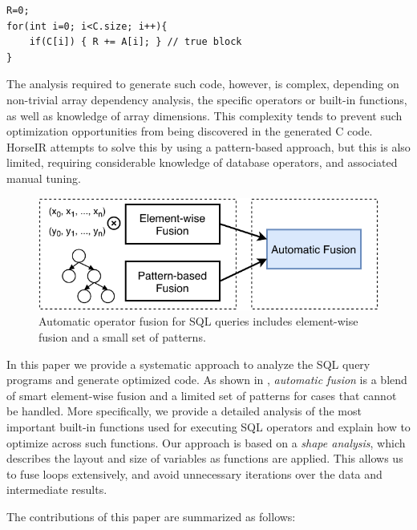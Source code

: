 \begin{small}
\begin{Verbatim}[xleftmargin=.15\columnwidth]
R=0;
for(int i=0; i<C.size; i++){
    if(C[i]) { R += A[i]; } // true block
}
\end{Verbatim}
\end{small}

\noindent{}The analysis required to generate such code, however, is complex,
depending on non-trivial array dependency analysis, the specific operators or built-in functions, as well as knowledge of array dimensions.
This complexity tends to prevent such optimization opportunities from being discovered in the generated C code.
HorseIR attempts to solve this by using a pattern-based approach, but this is also limited, requiring
considerable knowledge of database operators, and associated manual tuning.

\begin{figure}[htbp]
\centering
\includegraphics[width=.9\columnwidth]{./src/figure/basic-idea.pdf}
\caption{Automatic operator fusion for SQL queries includes element-wise fusion and a small set of patterns.}
\label{fig:fusion_idea}
\end{figure}

In this paper we provide a systematic approach to analyze the SQL query programs
and generate optimized code. As shown in ,
\textit{automatic fusion} is a blend of smart element-wise fusion and a limited set of
patterns for cases that cannot be handled. More specifically, we provide a detailed
analysis of the most important built-in functions used for executing SQL operators
and explain how to optimize across such functions. Our approach is based on a
\textit{shape analysis}, which describes the layout and size of variables as
functions are applied. This allows us to fuse loops extensively, and avoid unnecessary
iterations over the data and intermediate results.  

The contributions of this paper are summarized as follows:

